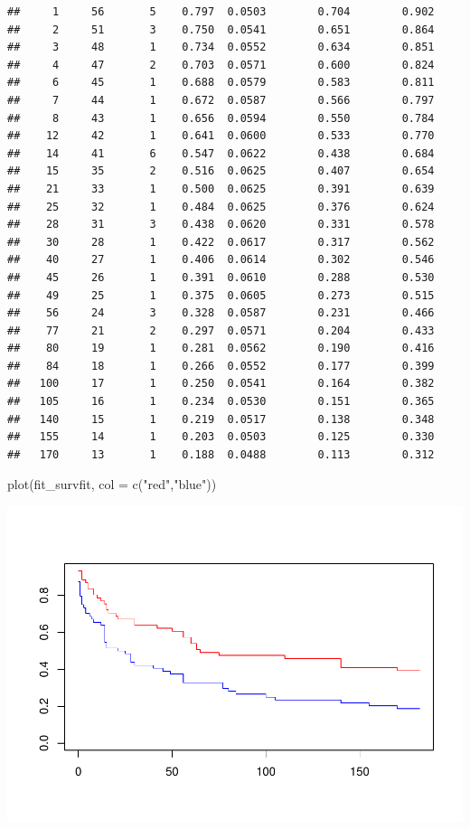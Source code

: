 \documentclass[
]{article}
\newenvironment{Shaded}{\begin{snugshade}}{\end{snugshade}}
\newcommand{\AttributeTok}[1]{\textcolor[rgb]{0.77,0.63,0.00}{#1}}
\newcommand{\FunctionTok}[1]{\textcolor[rgb]{0.00,0.00,0.00}{#1}}
\newcommand{\NormalTok}[1]{#1}
\newcommand{\StringTok}[1]{\textcolor[rgb]{0.31,0.60,0.02}{#1}}
\begin{document}
\begin{verbatim}
##     1     56       5    0.797  0.0503        0.704        0.902
##     2     51       3    0.750  0.0541        0.651        0.864
##     3     48       1    0.734  0.0552        0.634        0.851
##     4     47       2    0.703  0.0571        0.600        0.824
##     6     45       1    0.688  0.0579        0.583        0.811
##     7     44       1    0.672  0.0587        0.566        0.797
##     8     43       1    0.656  0.0594        0.550        0.784
##    12     42       1    0.641  0.0600        0.533        0.770
##    14     41       6    0.547  0.0622        0.438        0.684
##    15     35       2    0.516  0.0625        0.407        0.654
##    21     33       1    0.500  0.0625        0.391        0.639
##    25     32       1    0.484  0.0625        0.376        0.624
##    28     31       3    0.438  0.0620        0.331        0.578
##    30     28       1    0.422  0.0617        0.317        0.562
##    40     27       1    0.406  0.0614        0.302        0.546
##    45     26       1    0.391  0.0610        0.288        0.530
##    49     25       1    0.375  0.0605        0.273        0.515
##    56     24       3    0.328  0.0587        0.231        0.466
##    77     21       2    0.297  0.0571        0.204        0.433
##    80     19       1    0.281  0.0562        0.190        0.416
##    84     18       1    0.266  0.0552        0.177        0.399
##   100     17       1    0.250  0.0541        0.164        0.382
##   105     16       1    0.234  0.0530        0.151        0.365
##   140     15       1    0.219  0.0517        0.138        0.348
##   155     14       1    0.203  0.0503        0.125        0.330
##   170     13       1    0.188  0.0488        0.113        0.312
\end{verbatim}

\begin{Shaded}
\begin{Highlighting}[]
\FunctionTok{plot}\NormalTok{(fit\_survfit, }\AttributeTok{col =} \FunctionTok{c}\NormalTok{(}\StringTok{"red"}\NormalTok{,}\StringTok{"blue"}\NormalTok{))}
\end{Highlighting}
\end{Shaded}

\includegraphics{hw_7_files/figure-latex/unnamed-chunk-1-1.pdf}
\end{document}
